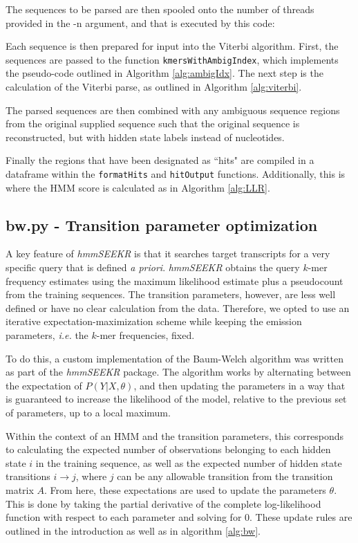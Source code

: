 The sequences to be parsed are then spooled onto the number of threads provided in the -n argument, and that is executed by this code:



Each sequence is then prepared for input into the Viterbi algorithm. First, the sequences are passed to the function \texttt{kmersWithAmbigIndex}, which implements the pseudo-code outlined in Algorithm \ref{alg:ambigIdx}. The next step is the calculation of the Viterbi parse, as outlined in Algorithm \ref{alg:viterbi}. 



The parsed sequences are then combined with any ambiguous sequence regions from the original supplied sequence such that the original sequence is reconstructed, but with hidden state labels instead of nucleotides. 

Finally the regions that have been designated as ``hits" are compiled in a dataframe within the \texttt{formatHits} and \texttt{hitOutput} functions. Additionally, this is where the HMM score is calculated as in Algorithm \ref{alg:LLR}. 

\subsection{bw.py - Transition parameter optimization}
A key feature of \textit{hmmSEEKR} is that it searches target transcripts for a very specific query that is defined \textit{a priori}. \textit{hmmSEEKR} obtains the query $k$-mer frequency estimates using the maximum likelihood estimate plus a pseudocount from the training sequences. The transition parameters, however, are less well defined or have no clear calculation from the data. Therefore, we opted to use an iterative expectation-maximization scheme while keeping the emission parameters, \textit{i.e.} the $k$-mer frequencies, fixed. 

To do this, a custom implementation of the Baum-Welch algorithm was written as part of the \textit{hmmSEEKR} package. The algorithm works by alternating between the expectation of $P(Y | X, \theta)$, and then updating the parameters in a way that is guaranteed to increase the likelihood of the model, relative to the previous set of parameters, up to a local maximum. 

Within the context of an HMM and the transition parameters, this corresponds to calculating the expected number of observations belonging to each hidden state $i$ in the training sequence, as well as the expected number of hidden state transitions $i \rightarrow j$, where $j$ can be any allowable transition from the transition matrix $A$. From here, these expectations are used to update the parameters $\theta$. This is done by taking the partial derivative of the complete log-likelihood function with respect to each parameter and solving for 0. These update rules are outlined in the introduction as well as in algorithm \ref{alg:bw}. 


